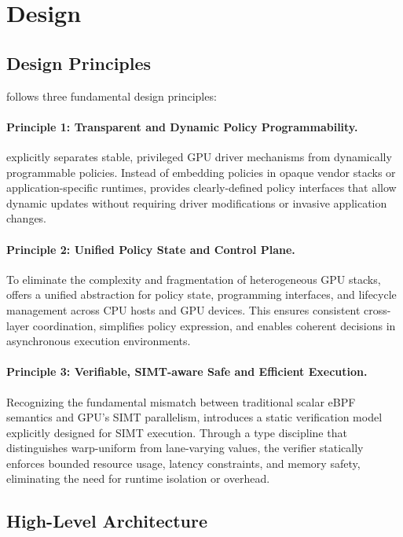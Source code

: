 \section{\sys Design}

\subsection{Design Principles}

\sys follows three fundamental design principles:

\paragraph{Principle 1: Transparent and Dynamic Policy Programmability.}
\sys explicitly separates stable, privileged GPU driver mechanisms from dynamically programmable policies. Instead of embedding policies in opaque vendor stacks or application-specific runtimes, \sys provides clearly-defined policy interfaces that allow dynamic updates without requiring driver modifications or invasive application changes.

\paragraph{Principle 2: Unified Policy State and Control Plane.}
To eliminate the complexity and fragmentation of heterogeneous GPU stacks, \sys offers a unified abstraction for policy state, programming interfaces, and lifecycle management across CPU hosts and GPU devices. This ensures consistent cross-layer coordination, simplifies policy expression, and enables coherent decisions in asynchronous execution environments.

\paragraph{Principle 3: Verifiable, SIMT-aware Safe and Efficient Execution.}
Recognizing the fundamental mismatch between traditional scalar eBPF semantics and GPU's SIMT parallelism, \sys introduces a static verification model explicitly designed for SIMT execution. Through a type discipline that distinguishes warp-uniform from lane-varying values, the verifier statically enforces bounded resource usage, latency constraints, and memory safety, eliminating the need for runtime isolation or overhead.

\subsection{High-Level Architecture}
\label{sec:arch}

